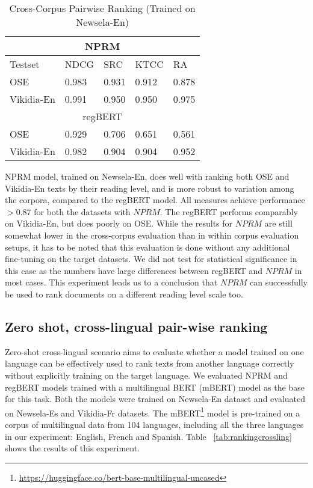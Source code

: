 \documentclass[11pt]{article}
\begin{document}
\begin{table}[htb]
\begin{tabular}{ |p{2.45cm}|p{0.85cm}|p{0.7cm}|p{0.8cm}| p{0.7cm}|}
 \hline 
 \multicolumn{5}{|c|}{NPRM} \\ \hline Testset & NDCG & SRC & KTCC & RA\\
 \hline
 OSE&  0.983 & 0.931 & 0.912 & 0.878\\ 
 \hline
 Vikidia-En & 0.991 & 0.950 & 0.950 & 0.975\\
 \hline
  \multicolumn{5}{|c|}{regBERT} \\ \hline OSE & 0.929 & 0.706 & 0.651 & 0.561\\
 \hline
 Vikidia-En& 0.982 & 0.904 & 0.904 & 0.952\\
 \hline
\end{tabular}
\caption{Cross-Corpus Pairwise Ranking (Trained on Newsela-En)}
\label{tab:rankingcross}
\end{table}

NPRM model, trained on Newsela-En, does well with ranking both OSE and Vikidia-En texts by their reading level, and is more robust to variation among the corpora, compared to the regBERT model. All measures achieve performance $>0.87$ for both the datasets with \textit{$NPRM$}. The regBERT performs comparably on Vikidia-En, but does poorly on OSE. While the results for $NPRM$ are still somewhat lower in the cross-corpus evaluation than in within corpus evaluation setups, it has to be noted that this evaluation is done without any additional fine-tuning on the target datasets. We did not test for statistical significance in this case as the numbers have large differences between regBERT and $NPRM$ in most cases. This experiment leads us to a conclusion that $NPRM$ can successfully be used to rank documents on a different reading level scale too. 

\subsection{Zero shot, cross-lingual pair-wise ranking}
Zero-shot cross-lingual scenario aims to evaluate whether a model trained on one language can be effectively used to rank texts from another language correctly without explicitly training on the target language. We evaluated NPRM and regBERT models trained with a multilingual BERT (mBERT) model as the base for this task. Both the models were trained on Newsela-En dataset and evaluated on Newsela-Es and Vikidia-Fr datasets. The mBERT\footnote{\url{https://huggingface.co/bert-base-multilingual-uncased}} model is pre-trained on a corpus of multilingual data from 104 languages, including all the three languages in our experiment: English, French and Spanish.  Table ~\ref{tab:rankingcrossling} shows the results of this experiment. 
\end{document}

